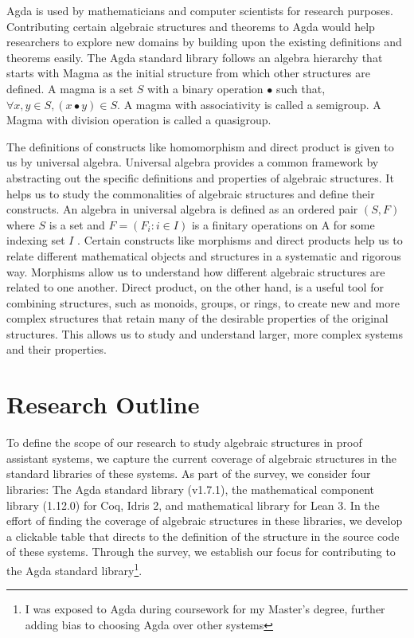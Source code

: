 Agda is used by mathematicians and computer scientists for research purposes.
Contributing certain algebraic structures and theorems to Agda would help
researchers to explore new domains by building upon the existing definitions and
theorems easily. The Agda standard library follows an algebra hierarchy that
starts with Magma as the initial structure from which other structures are
defined. A magma is a set $S$ with a binary operation $∙$ such that, $\forall
x,y \in S, (x ∙ y) \in S$. A magma with associativity is called a semigroup. A
Magma with division operation is called a quasigroup.

The definitions of constructs like homomorphism and direct product is given to
us by universal algebra. Universal algebra provides a common framework by
abstracting out the specific definitions and properties of algebraic structures.
It helps us to study the commonalities of algebraic structures and define their
constructs. An algebra in universal algebra is defined as an ordered pair
$(S,F)$ where $S$ is a set and $F = (F_i:i\in I)$ is a finitary operations on A
for some indexing set $I$ \cite{sannella2012foundations}. Certain constructs
like morphisms and direct products help us to relate different mathematical
objects and structures in a systematic and rigorous way. Morphisms
allow us to understand how different algebraic structures are related to one
another. Direct product, on the other hand, is a useful tool for combining
structures, such as monoids, groups, or rings, to create new and more
complex structures that retain many of the desirable properties of the original
structures. This allows us to study and understand larger, more complex systems
and their properties.

\section{Research Outline}
To define the scope of our research to study algebraic structures in proof
assistant systems, we capture the current coverage of algebraic structures in
the standard libraries of these systems. As part of the survey, we consider four
libraries: The Agda standard library (v1.7.1), the mathematical component
library (1.12.0) for Coq, Idris 2, and mathematical library for Lean 3. In
the effort of finding the coverage of algebraic structures in these libraries, we
develop a clickable table that directs to the definition of the structure in the
source code of these systems. Through the survey, we establish our focus for
contributing to the Agda standard library\footnote{I was exposed to Agda during
coursework for my Master's degree, further adding bias to choosing Agda over
other systems}.


